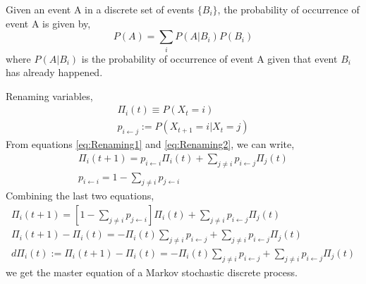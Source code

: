 \begin{theorem}
Given an event A in a discrete set of events $\{B_{i}\}$, the probability of occurrence of event A is given by,
\begin{equation}
    P\left(A\right) = \sum_{i}P\left(A|B_{i}\right)P\left(B_{i}\right)
\end{equation}
where $P\left(A|B_{i}\right)$ is the probability of occurrence of event A given that event $B_{i}$ has already happened. 
\end{theorem}
Renaming variables,
\begin{align}
    \label{eq:Renaming1}
    \Pi_{i}(t) \equiv P\left(X_{t} = i\right) \\
    \label{eq:Renaming2}
    p_{i \leftarrow j} := P\left(X_{t+1} = i | X_{t}=j\right)
\end{align}
From equations \ref{eq:Renaming1} and \ref{eq:Renaming2}, we can write,
\begin{align}
        \Pi_{i}(t+1) = p_{i \leftarrow i}\Pi_{i}(t) + \sum_{j \neq i} p_{i \leftarrow j}\Pi_{j}(t) \\ 
        p_{i \leftarrow i} = 1 - \sum_{j\neq i}p_{j \leftarrow i}
\end{align}
Combining the last two equations,
\begin{align}
    \Pi_{i}(t+1) = \left[1 - \sum_{j\neq i}p_{j \leftarrow i}\right]\Pi_{i}(t) + \sum_{j\neq i}p_{i \leftarrow j}\Pi_{j}(t)\\
    \Pi_{i}(t+1) - \Pi_{i}(t) = -\Pi_{i}(t) \sum_{j \neq i}p_{i \leftarrow j} + \sum_{j \neq i} p_{i \leftarrow j}\Pi_{j}(t) \\
    \label{eq: MasterEquationDiscrete}
    d\Pi_{i}(t) := \Pi_{i}(t+1) - \Pi_{i}(t) =  -\Pi_{i}(t) \sum_{j \neq i}p_{i \leftarrow j} + \sum_{j \neq i} p_{i \leftarrow j}\Pi_{j}(t)
\end{align}
we get the master equation of a Markov stochastic discrete process.
